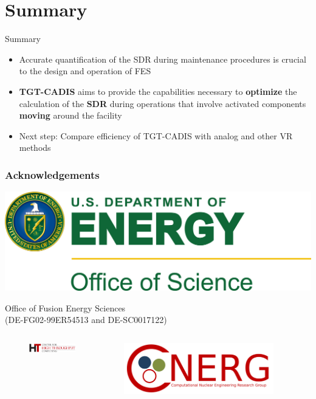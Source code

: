 \documentclass{beamer}
\begin{document}
\section{Summary}
\begin{frame}{Summary}
	\begin{itemize}
		\item{Accurate quantification of the SDR during maintenance
			procedures is crucial to the design and operation of
			FES}
\vspace{0.5cm}
		\item{\textbf{TGT-CADIS} aims to provide the capabilities necessary to
			\textbf{optimize} the calculation of the \textbf{SDR}
			during operations that involve activated components
			\textbf{moving} around the facility}
\vspace{0.5cm}
                 \item{Next step: Compare efficiency of TGT-CADIS with analog and other VR methods}
	\end{itemize}
\end{frame}

\begin{frame}
\frametitle{Acknowledgements}
        \centering
        \includegraphics[width=.4\textwidth]{doe.jpg}

	{Office of Fusion Energy Sciences\\}
        { (DE-FG02-99ER54513 and DE-SC0017122)}
\begin{minipage}{\textwidth}
\vspace{1cm}
\begin{columns}
\begin{column}{0.5\textwidth}
\begin{figure}
        \includegraphics[width=0.8\textwidth]{CHTC-logo.png}
\end{figure}
\end{column}
\begin{column}{0.5\textwidth}
        \includegraphics[width=0.8\textwidth]{cnerg-logo.png}
\end{column}
\end{columns}
\end{minipage}
\end{frame}
\end{document}
